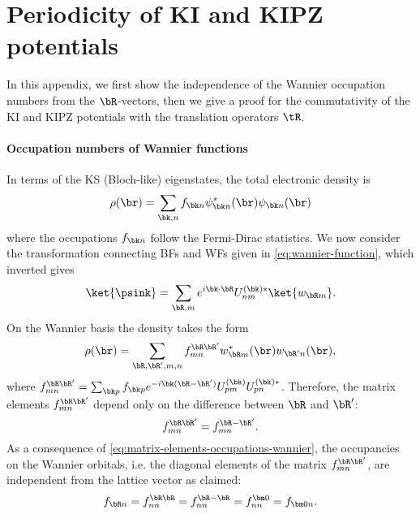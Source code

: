 \chapter{Periodicity of KI and KIPZ potentials\label{app:periodic-ki-kipz}}
In this appendix, we first show the independence of the Wannier occupation numbers from the $\bR$-vectors, then we give a proof for the commutativity of the KI and KIPZ potentials with the translation operators $\tR$.

\subsubsection*{Occupation numbers of Wannier functions}
In terms of the KS (Bloch-like) eigenstates, the total electronic density is
%
\begin{equation}
    \rho(\br) = \sum_{\bk,n} f_{\bk n} \psi^*_{\bk n}(\br) \psi_{\bk n}(\br)
    \label{eq:density-bloch}
\end{equation}
%
where the occupations $f_{\bk n}$ follow the Fermi-Dirac statistics. We now consider the transformation connecting BFs and WFs given in \cref{eq:wannier-function}, which inverted gives
%
\begin{equation}
    \ket{\psink} = \sum_{\bR,m} e^{i\bk \cdot \bR} U^{(\bk)*}_{nm} \ket{w_{\bR m}} .
    \label{eq:bloch-wannier}
\end{equation}
%
On the Wannier basis the density takes the form
%
\begin{equation}
    \rho(\br) = \sum_{\bR,\bR',m,n} f_{mn}^{\bR\bR'} w^*_{\bR m}(\br) w_{\bR' n}(\br) , 
\end{equation}
%
where $f_{mn}^{\bR\bR'} = \sum_{\bk p} f_{\bk p} e^{-i\bk(\bR-\bR')} U^{(\bk)}_{pm} U^{(\bk)*}_{pn}$. Therefore, the matrix elements $f_{mn}^{\bR\bR'}$ depend only on the difference between $\bR$ and $\bR'$:
\begin{equation}
    f_{mn}^{\bR\bR'} = f_{mn}^{\bR-\bR'} .
    \label{eq:matrix-elements-occupations-wannier}
\end{equation}
%
As a consequence of \cref{eq:matrix-elements-occupations-wannier}, the occupancies on the Wannier orbitals, i.e. the diagonal elements of the matrix $f_{mn}^{\bR\bR'}$, are independent from the lattice vector as claimed:
%
\begin{equation}
    f_{\bR n} = f_{nn}^{\bR\bR} = f_{nn}^{\bR-\bR} = f_{nn}^{\bm 0} = f_{{\bm 0}n} .
\end{equation}

